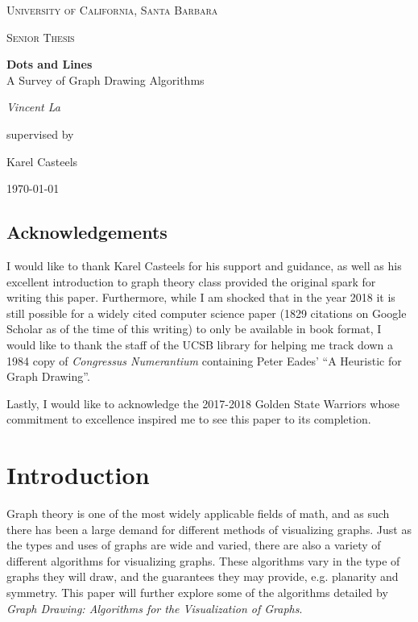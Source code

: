 \documentclass[11pt]{report}
\begin{document}
\begin{titlepage}
    \centering
    {\scshape\LARGE University of California, Santa Barbara \par}
    \vspace{1cm}
    {\scshape\Large Senior Thesis\par}
    \vspace{1.5cm}
    {\huge{\bfseries Dots and Lines} \\
        {\LARGE A Survey of Graph Drawing Algorithms} \par}
    \vspace{2cm}
    {\Large\itshape Vincent La\par}
    \vfill
    supervised by\par
    Karel Casteels
    
    \vfill
    
    {\large \today\par}
\end{titlepage}
    
\tableofcontents

\pagebreak

\section*{Acknowledgements}

I would like to thank Karel Casteels for his support and guidance, as well as his excellent introduction to graph theory class provided the original spark for writing this paper. Furthermore, while I am shocked that in the year 2018 it is still possible for a widely cited computer science paper (1829 citations on Google Scholar as of the time of this writing) to only be available in book format, I would like to thank the staff of the UCSB library for helping me track down a 1984 copy of \textit{Congressus Numerantium} containing Peter Eades' ``A Heuristic for Graph Drawing''.

\bigskip

Lastly, I would like to acknowledge the 2017-2018 Golden State Warriors whose commitment to excellence inspired me to see this paper to its completion.

\pagebreak

\chapter{Introduction}
Graph theory is one of the most widely applicable fields of math, and as such there has been a large demand for different methods of visualizing graphs. Just as the types and uses of graphs are wide and varied, there are also a variety of different algorithms for visualizing graphs. These algorithms vary in the type of graphs they will draw, and the guarantees they may provide, e.g. planarity and symmetry. This paper will further explore some of the algorithms detailed by \textit{Graph Drawing: Algorithms for the Visualization of Graphs}. \cite[see][page 12]{Battista:1998:GDA:551884}
\end{document}
